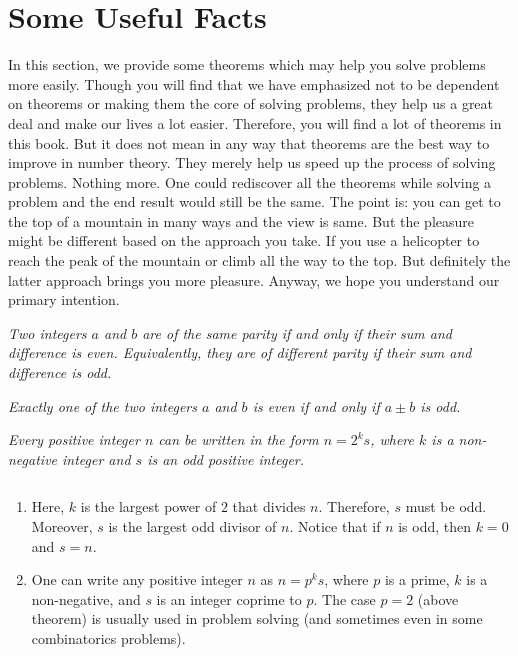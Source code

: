\documentclass{subfile}
\begin{document}
	\section{Some Useful Facts}\label{sec:theoremsindiv}
	In this section, we provide some theorems which may help you solve problems more easily. Though you will find that we have emphasized not to be dependent on theorems or making them the core of solving problems, they help us a great deal and make our lives a lot easier. Therefore, you will find a lot of theorems in this book. But it does not mean in any way that theorems are the best way to improve in number theory. They merely help us speed up the process of solving problems. Nothing more. One could rediscover all the theorems while solving a problem and the end result would still be the same. The point is: you can get to the top of a mountain in many ways and the view is same. But the pleasure might be different based on the approach you take. If you use a helicopter to reach the peak of the mountain or climb all the way to the top. But definitely the latter approach brings you more pleasure. Anyway, we hope you understand our primary intention.

	\begin{theorem}\slshape
		Two integers $a$ and $b$ are of the same parity if and only if their sum and difference is even. Equivalently, they are of different parity if their sum and difference is odd.
	\end{theorem}

	\begin{corollary}\slshape\label{cor:sumparity}
		Exactly one of the two integers $a$ and $b$ is even if and only if $a\pm b$ is odd.
	\end{corollary}

	\begin{theorem}\slshape\label{thm:factorizeintopowersoftwo}
		Every positive integer $n$ can be written in the form $n=2^ks$, where $k$ is a non-negative integer and $s$ is an odd positive integer.
	\end{theorem}

	\begin{note}
		$ $
		\begin{enumerate}
			\item Here, $k$ is the largest power of $2$ that divides $n$. Therefore, $s$ must be odd. Moreover, $s$ is the largest odd divisor of $n$. Notice that if $n$ is odd, then $k=0$ and $s=n$.
			\item  One can write any positive integer $n$ as $n=p^ks$, where $p$ is a prime, $k$ is a non-negative, and $s$ is an integer coprime to $p$. The case $p=2$ (above theorem) is usually used in problem solving (and sometimes even in some combinatorics problems).
		\end{enumerate}
	\end{note}
\end{document}
